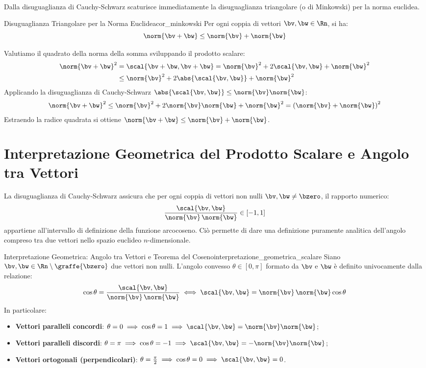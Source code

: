 Dalla disuguaglianza di Cauchy-Schwarz scaturisce immediatamente la disuguaglianza triangolare (o di Minkowski) per la norma euclidea.

\begin{corollario}{Disuguaglianza Triangolare per la Norma Euclidea}{cor_minkowski}
Per ogni coppia di vettori $\bv, \bw \in \Rn$, si ha:
\[
\norm{\bv + \bw} \le \norm{\bv} + \norm{\bw}
\]
\end{corollario}

\begin{dimostrazione}
Valutiamo il quadrato della norma della somma sviluppando il prodotto scalare:
\begin{align*}
\norm{\bv + \bw}^2 &= \scal{\bv + \bw, \bv + \bw} = \norm{\bv}^2 + 2\scal{\bv, \bw} + \norm{\bw}^2 \\
&\le \norm{\bv}^2 + 2\abs{\scal{\bv, \bw}} + \norm{\bw}^2
\end{align*}
Applicando la disuguaglianza di Cauchy-Schwarz $\abs{\scal{\bv, \bw}} \le \norm{\bv}\norm{\bw}$:
\[
\norm{\bv + \bw}^2 \le \norm{\bv}^2 + 2\norm{\bv}\norm{\bw} + \norm{\bw}^2 = \left( \norm{\bv} + \norm{\bw} \right)^2
\]
Estraendo la radice quadrata si ottiene $\norm{\bv + \bw} \le \norm{\bv} + \norm{\bw}$.
\end{dimostrazione}

\section{Interpretazione Geometrica del Prodotto Scalare e Angolo tra Vettori}

La disuguaglianza di Cauchy-Schwarz assicura che per ogni coppia di vettori non nulli $\bv, \bw \neq \bzero$, il rapporto numerico:
\[
\frac{\scal{\bv, \bw}}{\norm{\bv} \, \norm{\bw}} \in [-1, 1]
\]
appartiene all'intervallo di definizione della funzione arcocoseno. Ciò permette di dare una definizione puramente analitica dell'angolo compreso tra due vettori nello spazio euclideo $n$-dimensionale.

\begin{teorema}{Interpretazione Geometrica: Angolo tra Vettori e Teorema del Coseno}{interpretazione_geometrica_scalare}
Siano $\bv, \bw \in \Rn \setminus \graffe{\bzero}$ due vettori non nulli. L'angolo convesso $\theta \in [0, \pi]$ formato da $\bv$ e $\bw$ è definito univocamente dalla relazione:
\[
\cos\theta = \frac{\scal{\bv, \bw}}{\norm{\bv} \, \norm{\bw}} \iff \scal{\bv, \bw} = \norm{\bv} \, \norm{\bw} \cos\theta
\]
In particolare:
\begin{itemize}
    \item \textbf{Vettori paralleli concordi}: $\theta = 0 \implies \cos\theta = 1 \implies \scal{\bv, \bw} = \norm{\bv}\norm{\bw}$;
    \item \textbf{Vettori paralleli discordi}: $\theta = \pi \implies \cos\theta = -1 \implies \scal{\bv, \bw} = -\norm{\bv}\norm{\bw}$;
    \item \textbf{Vettori ortogonali (perpendicolari)}: $\theta = \frac{\pi}{2} \implies \cos\theta = 0 \implies \scal{\bv, \bw} = 0$.
\end{itemize}
\end{teorema}

